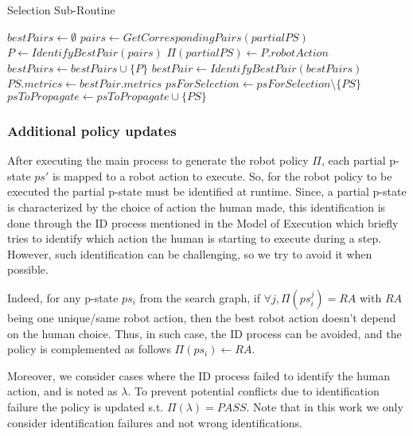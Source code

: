 \begin{algorithm}
\caption{Selection Sub-Routine}\label{alg:selection}
\begin{algorithmic}[1]

        \State $bestPairs \gets \emptyset$
            \State $pairs \gets GetCorrespondingPairs(partialPS)$
            \State $P \gets IdentifyBestPair(pairs)$ 
            \State $\Pi(partialPS) \gets P.robotAction$
            \State $bestPairs \gets bestPairs \cup \{P\}$
        \EndFor
        \State 
        \State $bestPair \gets IdentifyBestPair(bestPairs)$
        \State 
        \State $PS.metrics \gets bestPair.metrics$
        \State $psForSelection \gets psForSelection \setminus \{PS\}$
        \State $psToPropagate \gets psToPropagate \cup \{PS\}$
    \EndIf
\EndFor

\end{algorithmic}
\end{algorithm}

    \subsubsection{Additional policy updates}

After executing the main process to generate the robot policy $\Pi$, each partial p-state $ps'$ is mapped to a robot action to execute. So, for the robot policy to be executed the partial p-state must be identified at runtime. 
Since, a partial p-state is characterized by the choice of action the human made, this identification is done through the ID process mentioned in the Model of Execution which briefly tries to identify which action the human is starting to execute during a step. However, such identification can be challenging, so we try to avoid it when possible. 

Indeed, for any p-state $ps_i$ from the search graph, if $\forall j, \Pi(ps_i^j) = RA$ with $RA$ being one unique/same robot action, then the best robot action doesn't depend on the human choice. Thus, in such case, the ID process can be avoided, and the policy is complemented as follows $\Pi(ps_i) \gets RA$.

Moreover, we consider cases where the ID process failed to identify the human action, and is noted as $\lambda$. To prevent potential conflicts due to identification failure the policy is updated s.t. $\Pi(\lambda) = PASS$.
Note that in this work we only consider identification failures and not wrong identifications. 

